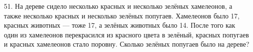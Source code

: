 51. На дереве сидело несколько красных и несколько зелёных хамелеонов, а также несколько красных и несколько зелёных попугаев. Хамелеонов было 17, красных животных --- тоже 17, а зелёных животных было 14. После того как один из хамелеонов перекрасился из красного цвета в зелёный, красных попугаев и красных хамелеонов стало поровну. Сколько зелёных попугаев было на дереве?\\
